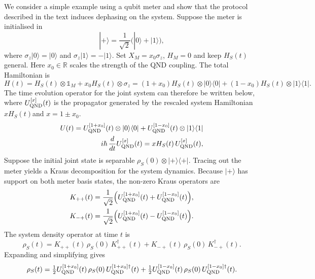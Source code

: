 \qquad We consider a simple example using a qubit meter and show that the protocol described in the text induces dephasing on the system. Suppose the meter is initialised in
\begin{equation}
    |+\rangle = \frac{1}{\sqrt{2}}\big(|0\rangle + |1\rangle\big),
\end{equation}
where $\sigma_z|0\rangle = |0\rangle$ and $\sigma_z|1\rangle = -|1\rangle$. Set $X_M = x_0\sigma_z$, $H_M=0$ and keep $H_S(t)$ general. Here $x_0\in\mathbb{R}$ scales the strength of the QND coupling. The total Hamiltonian is
\begin{equation}\label{eq:Htot_meter}
    H(t) = H_S(t)\otimes\mathds{1}_M + x_0 H_S(t)\otimes\sigma_z
    = (1+x_0)H_S(t)\otimes|0\rangle\langle0| + (1-x_0)H_S(t)\otimes|1\rangle\langle1|.
\end{equation}
The time evolution operator for the joint system can therefore be written below, where $U^{[x]}_{\rm QND}(t)$ is the propagator generated by the rescaled system Hamiltonian $xH_S(t)$and $x=1\pm x_0$.
\begin{align}\label{eq:U_tot}
    U(t) = U^{[1+x_0]}_{\rm QND}(t)\otimes|0\rangle\langle0| + U^{[1-x_0]}_{\rm QND}(t)\otimes|1\rangle\langle1| \nonumber \\
    i\hbar\,\frac{d}{dt}U^{[x]}_{\rm QND}(t) = x H_S(t)\,U^{[x]}_{\rm QND}(t),
\end{align}
Suppose the initial joint state is separable $\rho_S(0)\otimes|+\rangle\langle+|$. Tracing out the meter yields a Kraus decomposition for the system dynamics. Because $|+\rangle$ has support on both meter basis states, the non-zero Kraus operators are
\begin{subequations}
\begin{align}
    K_{++}(t) &= \frac{1}{\sqrt{2}}\Big(U^{[1+x_0]}_{\rm QND}(t) + U^{[1-x_0]}_{\rm QND}(t)\Big), \\
    K_{-+}(t) &= \frac{1}{\sqrt{2}}\Big(U^{[1+x_0]}_{\rm QND}(t) - U^{[1-x_0]}_{\rm QND}(t)\Big).
\end{align}
\end{subequations}
The system density operator at time $t$ is
\begin{equation}\label{eq:rho_kraus}
    \rho_S(t) = K_{++}(t)\,\rho_S(0)\,K_{++}^\dagger(t) + K_{-+}(t)\,\rho_S(0)\,K_{-+}^\dagger(t).
\end{equation}
Expanding and simplifying gives
\begin{equation}\label{eq:rho_halfsum}
    \rho_S(t) = \tfrac{1}{2}U^{[1+x_0]}_{\rm QND}(t)\,\rho_S(0)\,U^{[1+x_0]\dagger}_{\rm QND}(t) + \tfrac{1}{2}U^{[1-x_0]}_{\rm QND}(t)\,\rho_S(0)\,U^{[1-x_0]\dagger}_{\rm QND}(t).
\end{equation}
